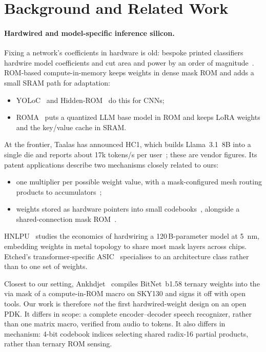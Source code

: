 \section{Background and Related Work}
\label{sec:background}

\paragraph{Hardwired and model-specific inference silicon.}
Fixing a network's coefficients in hardware is old: bespoke printed classifiers hardwire model coefficients and cut area and power by an order of magnitude~\cite{mubarik2020printed}. ROM-based compute-in-memory keeps weights in dense mask ROM and adds a small SRAM path for adaptation:
\begin{itemize}
\item YOLoC~\cite{chen2022yoloc} and Hidden-ROM~\cite{chen2022hiddenrom} do this for CNNs;
\item ROMA~\cite{wang2025roma} puts a quantized LLM base model in ROM and keeps LoRA weights and the key/value cache in SRAM.
\end{itemize}

At the frontier, Taalas has announced HC1, which builds Llama~3.1~8B into a single die and reports about 17k tokens/s per user~\cite{taalas2026hc1,zota2026heise}; these are vendor figures. Its patent applications describe two mechanisms closely related to ours:
\begin{itemize}
\item one multiplier per possible weight value, with a mask-configured mesh routing products to accumulators~\cite{taalas2025patent802};
\item weights stored as hardware pointers into small codebooks~\cite{taalas2026patent566}, alongside a shared-connection mask ROM~\cite{taalas2025wo724}.
\end{itemize}
HNLPU~\cite{liu2025hnlpu} studies the economics of hardwiring a 120\,B-parameter model at \SI{5}{nm}, embedding weights in metal topology to share most mask layers across chips. Etched's transformer-specific ASIC~\cite{mann2024etched} specialises to an architecture class rather than to one set of weights.

Closest to our setting, Ankhdjet~\cite{pai2026ankhdjet} compiles BitNet~b1.58 ternary weights into the via mask of a compute-in-ROM macro on SKY130 and signs it off with open tools. Our work is therefore \emph{not} the first hardwired-weight design on an open PDK. It differs in scope: a complete encoder--decoder speech recognizer, rather than one matrix macro, verified from audio to tokens. It also differs in mechanism: 4-bit codebook indices selecting shared radix-16 partial products, rather than ternary ROM sensing.


